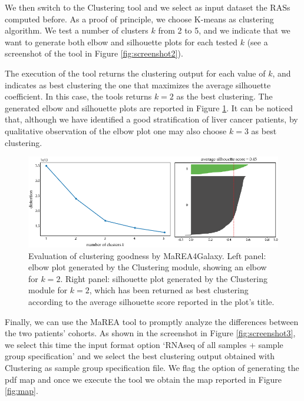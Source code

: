 \documentclass[preprint,12pt,authoryear]{elsarticle}
\newcommand{\mareagalaxy}{\textsf{MaREA4Galaxy}}
\newcommand{\mareaTool}{\textsf{MaREA}}
\newcommand{\clusterTool}{\textsf{Clustering}}
\begin{document}
We then switch to the \clusterTool{} tool and we select as input
dataset the RASs computed before. As a proof of principle, we choose
K-means as clustering algorithm. We test a number of clusters $k$ from
2 to 5, and we indicate that we want to generate both elbow and
silhouette plots for each tested $k$ (see a screenshot of the tool in
Figure \ref{fig:screenshot2}).

The execution of the tool returns the clustering output for each value
of $k$, and indicates as best clustering the one that maximizes the
average silhouette coefficient.
%
In this case, the tools returns $k = 2$ as the best clustering. The
generated elbow and silhouette plots are reported in Figure
\ref{fig:goodness}. It can be noticed that, although we have
identified a good stratification of liver cancer patients, by
qualitative observation of the elbow plot one may also choose $k = 3$
as best clustering.

\begin{figure}[ht]
  \includegraphics[width=1\textwidth]{figs/goodness.png}
  \caption{Evaluation of clustering goodness by \mareagalaxy{}. Left
    panel: elbow plot generated by the \clusterTool{} module, showing
    an elbow for $k = 2$. Right panel: silhouette plot generated by the
    \clusterTool{} module for $k = 2$, which has been returned as best
    clustering according to the average silhouette score reported in
    the plot's title.}
  \label{fig:goodness}
\end{figure}

Finally, we can use the \mareaTool{} tool to promptly analyze the
differences between the two patients' cohorts. As shown in the
screenshot in Figure \ref{fig:screenshot3}, we select this time the
input format option `RNAseq of all samples + sample group
specification' and we select the best clustering output obtained with
\clusterTool{} as sample group specification file. We flag the option
of generating the pdf map and once we execute the tool we obtain the
map reported in Figure \ref{fig:map}.
\end{document}
